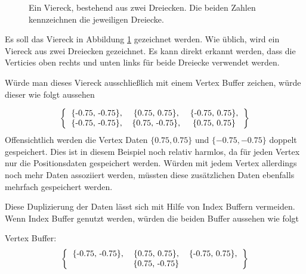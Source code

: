\begin{figure}
    \caption{Ein Viereck, bestehend aus zwei Dreiecken. Die beiden Zahlen kennzeichnen die jeweiligen Dreiecke.}
    \label{fig:vertexbufquad}
    \begin{center}
    \end{center}
\end{figure}

Es soll das Viereck in Abbildung \ref{fig:vertexbufquad} gezeichnet werden. Wie üblich, wird ein Viereck aus zwei Dreiecken gezeichnet. Es kann direkt erkannt werden, dass die Verticies oben rechts und unten links für beide Dreiecke verwendet werden.

Würde man dieses Viereck ausschließlich mit einem Vertex Buffer zeichen, würde dieser wie folgt aussehen

$$
\left\{
\begin{tabular}{ccc}
    \{-0.75, -0.75\}, & \{0.75, 0.75\},  & \{-0.75, 0.75\}, \\
    \{-0.75, -0.75\}, & \{0.75, -0.75\}, & \{0.75, 0.75\}
\end{tabular}    
\right\}
$$
Offensichtlich werden die Vertex Daten $\{0.75, 0.75\}$ und $\{-0.75, -0.75\}$ doppelt gespeichert.
Dies ist in diesem Beispiel noch relativ harmlos, da für jeden Vertex nur die Positionsdaten gespeichert werden. Würden mit jedem Vertex allerdings noch mehr Daten assoziiert werden, müssten diese zusätzlichen Daten ebenfalls mehrfach gespeichert werden.

Diese Duplizierung der Daten lässt sich mit Hilfe von Index Buffern vermeiden. Wenn Index Buffer genutzt werden, würden die beiden Buffer aussehen wie folgt 

Vertex Buffer: %
$$
\left\{
\begin{tabular}{ccc}
    \{-0.75, -0.75\}, & \{0.75, 0.75\}, & \{-0.75, 0.75\}, \\ 
                      & \{0.75, -0.75\} &
\end{tabular}    
\right\}
$$

